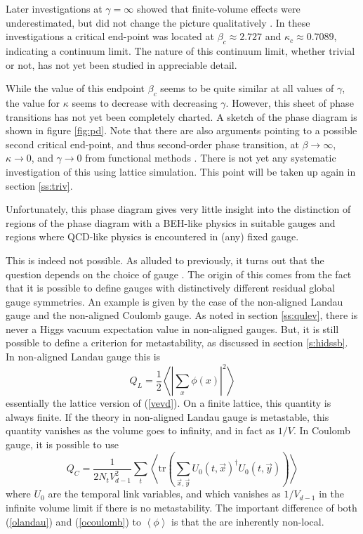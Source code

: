 \documentclass[final,12pt,3p,longtitle]{elsarticle}
\newcommand*{\no}{\noindent}
\newcommand*{\be}{\begin{equation}}
\newcommand*{\ee}{\end{equation}}
\newcommand*{\pref}[1]{(\ref{#1})}
\newcommand*{\tr}{\mathrm{tr}}
\newcommand*{\1}{1\!\!\!\bot}
\newcommand*{\la}{\left\langle}
\newcommand*{\ra}{\right\rangle}
\begin{document}
Later investigations at $\gamma=\infty$ showed that finite-volume effects were underestimated, but did not change the picture qualitatively \cite{Bonati:2009pf,Bonati:2009yi}. In these investigations a critical end-point was located at $\beta_c\approx2.727$ and $\kappa_c\approx0.7089$, indicating a continuum limit. The nature of this continuum limit, whether trivial or not, has not yet been studied in appreciable detail.

While the value of this endpoint $\beta_c$ seems to be quite similar at all values of $\gamma$, the value for $\kappa$ seems to decrease with decreasing $\gamma$. However, this sheet of phase transitions has not yet been completely charted. A sketch of the phase diagram is shown in figure \ref{fig:pd}. Note that there are also arguments pointing to a possible second critical end-point, and thus second-order phase transition, at $\beta\to\infty$, $\kappa\to 0$, and $\gamma\to 0$ from functional methods \cite{Gies:2015lia,Gies:2016kkk}. There is not yet any systematic investigation of this using lattice simulation. This point will be taken up again in section \ref{ss:triv}.

Unfortunately, this phase diagram gives very little insight into the distinction of regions of the phase diagram with a BEH-like physics in suitable gauges and regions where QCD-like physics is encountered in (any) fixed gauge.

This is indeed not possible. As alluded to previously, it turns out that the question depends on the choice of gauge \cite{Caudy:2007sf}. The origin of this comes from the fact that it is possible to define gauges with distinctively different residual global gauge symmetries. An example is given by the case of the non-aligned Landau gauge and the non-aligned Coulomb gauge. As noted in section \ref{ss:qulev}, there is never a Higgs vacuum expectation value in non-aligned gauges. But, it is still possible to define a criterion for metastability, as discussed in section \ref{s:hidssb}. In non-aligned Landau gauge this is \cite{Caudy:2007sf,Langfeld:2002ic}
\be
Q_L=\frac{1}{2}\la\left|\sum_x\phi(x)\right|^2\ra\label{olandau}
\ee
\no essentially the lattice version of \pref{vevd}. On a finite lattice, this quantity is always finite. If the theory in non-aligned Landau gauge is metastable, this quantity vanishes as the volume goes to infinity, and in fact as $1/V$. In Coulomb gauge, it is possible to use \cite{Caudy:2007sf,Greensite:2003xf}
\be
Q_C=\frac{1}{2N_tV_{d-1}^2}\sum_t\la\tr\left(\sum_{\vec x,\vec y}U_0(t,\vec x)^\dagger U_0(t,\vec y)\right)\ra\label{ocoulomb}
\ee
\no where $U_0$ are the temporal link variables, and which vanishes as $1/V_{d-1}$ in the infinite volume limit if there is no metastability. The important difference of both \pref{olandau} and \pref{ocoulomb} to $\la \phi\ra$ is that the are inherently non-local.
\end{document}
